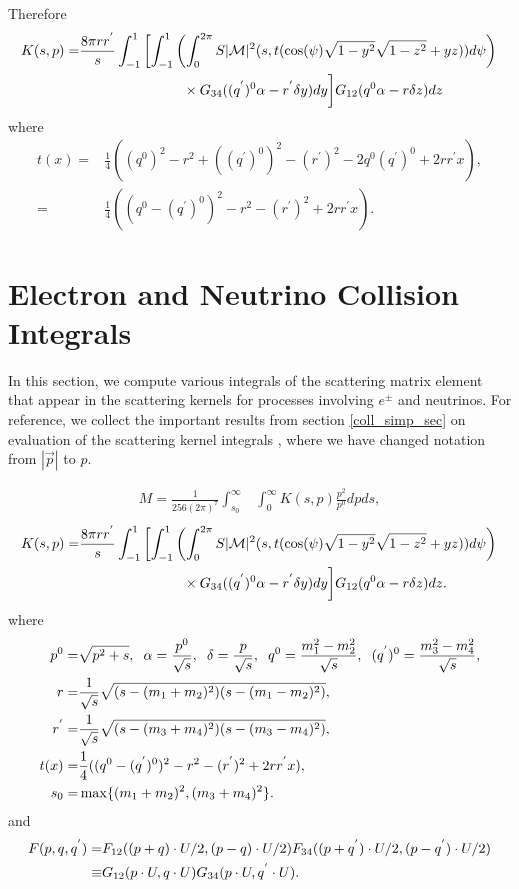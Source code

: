 Therefore 
\begin{align}
K(s,p)=&\frac{8\pi rr^{'}}{s}\int_{-1}^1 \left[\int_{-1}^1\left(\int_0^{2\pi} S |\mathcal{M}|^2 (s,t(\cos(\psi)\sqrt{1-y^2}\sqrt{1-z^2}+yz))d\psi\right)\right.\\
&\hspace{26mm}\times G_{34}((q^{'})^0\alpha-r^{'}\delta y) dy\bigg] G_{12}(q^0\alpha-r\delta z)dz
\end{align}
where
\begin{align}\label{t_def}
t(x)=&\frac{1}{4}((q^0)^2-r^2+((q^{'})^0)^2-(r^{'})^2-2q^0(q^{'})^0+2rr^{'}x),\\
=&\frac{1}{4}((q^0-(q^{'})^0)^2-r^2-(r^{'})^2+2rr^{'}x).
\end{align}


\section{Electron and Neutrino Collision Integrals}\label{nu_matrix_elements}
In this section, we compute various integrals of the scattering matrix element that appear in the scattering kernels for processes involving $e^\pm$ and neutrinos.  For reference, we collect the important results from section \ref{coll_simp_sec} on evaluation of the scattering kernel integrals , where we have changed notation from $|\vec p|$ to $p$.

\begin{align}\label{M_simp}
M=\frac{1}{256(2\pi)^7 }\int_{s_0}^\infty&\int_0^\infty K(s,p)\frac{ p^2}{p^0}dpds,
\end{align}
\begin{align}\label{matrix_elem_int}
K(s,p)=&\frac{8\pi rr^{'}}{s}\int_{-1}^1 \left[\int_{-1}^1\left(\int_0^{2\pi} S |\mathcal{M}|^2 (s,t(\cos(\psi)\sqrt{1-y^2}\sqrt{1-z^2}+yz))d\psi\right)\right.\\
&\hspace{26mm}\times G_{34}((q^{'})^0\alpha-r^{'}\delta y) dy\bigg] G_{12}(q^0\alpha-r\delta z)dz.
\end{align}
where
\begin{align}\label{t_def}
p^0=&\sqrt{p^2+s},\hspace{2mm} \alpha=\frac{p^0}{\sqrt{s}}, \hspace{2mm} \delta=\frac{p}{\sqrt{s}},\hspace{2mm}q^{0}=\frac{m_1^2-m_2^2}{\sqrt{s}},\hspace{2mm}(q^{'})^{0}=\frac{m_3^2-m_4^2}{\sqrt{s}},\\
r=&\frac{1}{\sqrt{s}}\sqrt{(s-(m_1+m_2)^2)(s-(m_1-m_2)^2)},\\
 r^{'}=&\frac{1}{\sqrt{s}}\sqrt{(s-(m_3+m_4)^2)(s-(m_3-m_4)^2)},\\
t(x)=&\frac{1}{4}((q^0-(q^{'})^0)^2-r^2-(r^{'})^2+2rr^{'}x),\\
s_0=&\max\{(m_1+m_2)^2,(m_3+m_4)^2\}.
\end{align}
and
\begin{align}
 F(p,q,q^{'})=&F_{12}((p+q)\cdot U/2,(p-q)\cdot U/2)F_{34}((p+q^{'})\cdot U/2,(p-q^{'})\cdot U/2)\\
\equiv &G_{12}(p\cdot U,q\cdot U)G_{34}(p\cdot U,q^{'}\cdot U)\notag.
\end{align}

